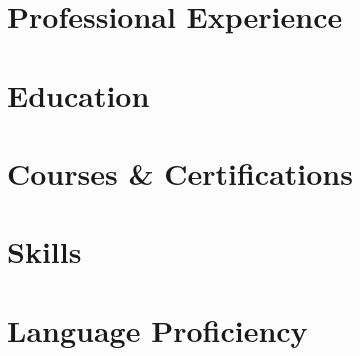 \documentclass[10pt,a4paper]{article}
\begin{document}
  

  

  \section*{Professional Experience}
  \vspace{-0.5em}
  

  \vspace{-0.5em}
  \section*{Education}
  \vspace{-0.5em}
  

  \vspace{-0.5em}
  \section*{Courses \& Certifications}
  \vspace{-0.5em}
  

  \vspace{-0.5em}
  \section*{Skills}
  \vspace{-0.5em}
  

  \vspace{-0.5em}
  \section*{Language Proficiency}
  \vspace{-0.5em}
  

  \vspace{-0.5em}
  

  
\end{document}
